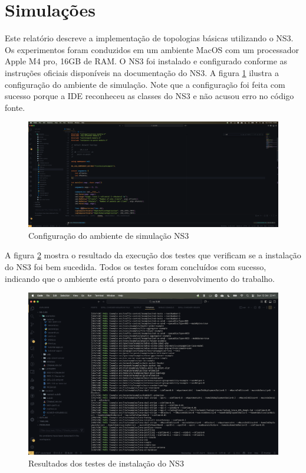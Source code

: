\documentclass[12pt,a4paper]{article}
\begin{document}
\section{Simulações}

Este relatório descreve a implementação de topologias básicas utilizando o NS3. Os experimentos foram conduzidos em um ambiente MacOS com um processador Apple M4 pro, 16GB de RAM. O NS3 foi instalado e configurado conforme as instruções oficiais disponíveis na documentação do NS3. A figura \ref{fig:ns3_setup} ilustra a configuração do ambiente de simulação. Note que a configuração foi feita com sucesso porque a IDE reconheceu as classes do NS3 e não acusou erro no código fonte.

\begin{figure}[H]
    \centering
    \includegraphics[width=1\textwidth]{initial_setup.png}
    \caption{Configuração do ambiente de simulação NS3}
    \label{fig:ns3_setup}
\end{figure}

A figura \ref{fig:ns3_test} mostra o resultado da execução dos testes que verificam se a instalação do NS3 foi bem sucedida. Todos os testes foram concluídos com sucesso, indicando que o ambiente está pronto para o desenvolvimento do trabalho.

\begin{figure}[H]
    \centering
    \includegraphics[width=1\textwidth]{test_results.png}
    \caption{Resultados dos testes de instalação do NS3}
    \label{fig:ns3_test}
\end{figure}
\end{document}
